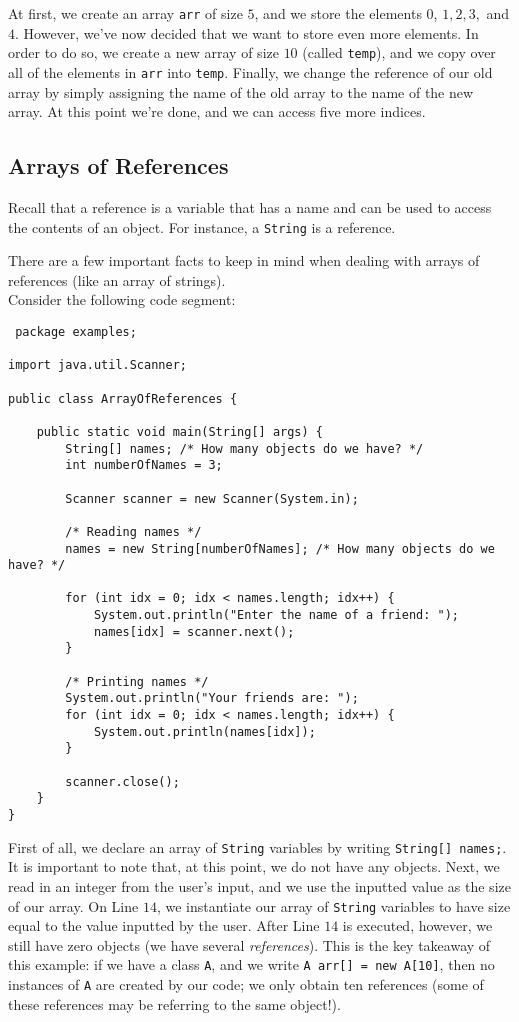 At first, we create an array \verb!arr! of size $5$, and we store the elements $0$, $1, 2, 3,$ and $4$. However, we've now decided that we want to store even more elements. In order to do so, we create a new array of size $10$ (called \verb!temp!), and we copy over all of the elements in \verb!arr! into \verb!temp!. Finally, we change the reference of our old array by simply assigning the name of the old array to the name of the new array. At this point we're done, and we can access five more indices. 

\subsection{Arrays of References}

 Recall that a reference is a variable that has a name and can be used to access the contents of an object. For instance, a \verb!String! is a reference. 
 
 There are a few important facts to keep in mind when dealing with arrays of references (like an array of strings). \\
 
 Consider the following code segment:
 
 \begin{lstlisting}
 package examples;

import java.util.Scanner;

public class ArrayOfReferences {

	public static void main(String[] args) {
		String[] names; /* How many objects do we have? */
		int numberOfNames = 3;

		Scanner scanner = new Scanner(System.in);

		/* Reading names */
		names = new String[numberOfNames]; /* How many objects do we have? */

		for (int idx = 0; idx < names.length; idx++) {
			System.out.println("Enter the name of a friend: ");
			names[idx] = scanner.next();
		}

		/* Printing names */
		System.out.println("Your friends are: ");
		for (int idx = 0; idx < names.length; idx++) {
			System.out.println(names[idx]);
		}

		scanner.close();
	}
}
 \end{lstlisting}
 
 First of all, we declare an array of \verb!String! variables by writing \verb!String[] names;!. It is important to note that, at this point, we do not have any objects. Next, we read in an integer from the user's input, and we use the inputted value as the size of our array. On Line $14$, we instantiate our array of \verb!String! variables to have size equal to the value inputted by the user. After Line $14$ is executed, however, we still have zero objects (we have several \textit{references}). This is the key takeaway of this example: if we have a class \verb!A!, and we write \verb!A arr[] = new A[10]!, then no instances of \verb!A! are created by our code; we only obtain ten references (some of these references may be referring to the same object!). \\
 

